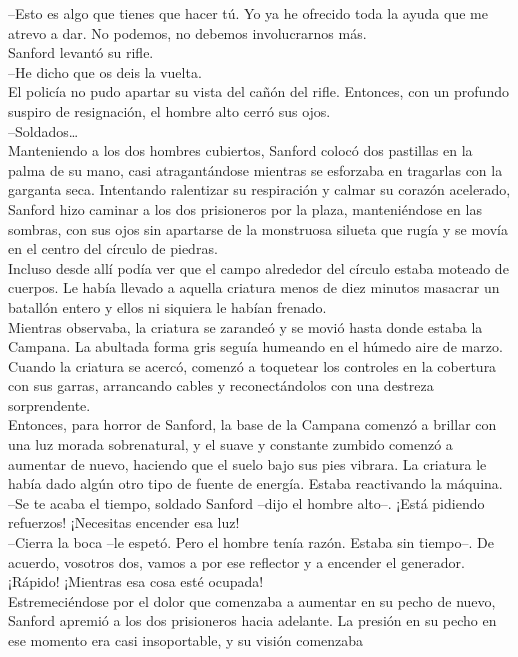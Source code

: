 --Esto es algo que tienes que hacer tú. Yo ya he ofrecido toda la ayuda
que me atrevo a dar. No podemos, no debemos involucrarnos más.\\
Sanford levantó su rifle.\\
--He dicho que os deis la vuelta.~\\
El policía no pudo apartar su vista del cañón del rifle. Entonces, con
un profundo suspiro de resignación, el hombre alto cerró sus ojos.\\
--Soldados\ldots{}\\
Manteniendo a los dos hombres cubiertos, Sanford colocó dos pastillas en
la palma de su mano, casi atragantándose mientras se esforzaba en
tragarlas con la garganta seca. Intentando ralentizar su respiración y
calmar su corazón acelerado, Sanford hizo caminar a los dos prisioneros
por la plaza, manteniéndose en las sombras, con sus ojos sin apartarse
de la monstruosa silueta que rugía y se movía en el centro del círculo
de piedras.\\
Incluso desde allí podía ver que el campo alrededor del círculo estaba
moteado de cuerpos. Le había llevado a aquella criatura menos de diez
minutos masacrar un batallón entero y ellos ni siquiera le habían
frenado.\\
Mientras observaba, la criatura se zarandeó y se movió hasta donde
estaba la Campana. La abultada forma gris seguía humeando en el húmedo
aire de marzo. Cuando la criatura se acercó, comenzó a toquetear los
controles en la cobertura con sus garras, arrancando cables y
reconectándolos con una destreza sorprendente.\\
Entonces, para horror de Sanford, la base de la Campana comenzó a
brillar con una luz morada sobrenatural, y el suave y constante zumbido
comenzó a aumentar de nuevo, haciendo que el suelo bajo sus pies
vibrara. La criatura le había dado algún otro tipo de fuente de energía.
Estaba reactivando la máquina.\\
--Se te acaba el tiempo, soldado Sanford --dijo el hombre alto--. ¡Está
pidiendo refuerzos! ¡Necesitas encender esa luz!\\
--Cierra la boca --le espetó. Pero el hombre tenía razón. Estaba sin
tiempo--. De acuerdo, vosotros dos, vamos a por ese reflector y a
encender el generador. ¡Rápido! ¡Mientras esa cosa esté ocupada!\\
Estremeciéndose por el dolor que comenzaba a aumentar en su pecho de
nuevo, Sanford apremió a los dos prisioneros hacia adelante. La presión
en su pecho en ese momento era casi insoportable, y su visión comenzaba
